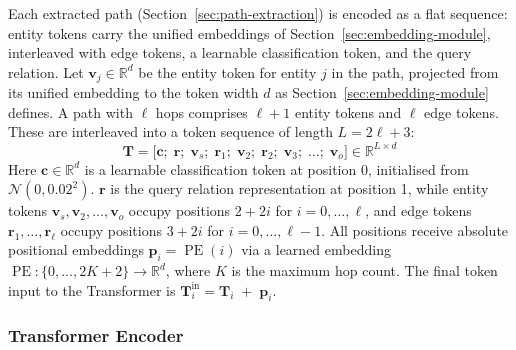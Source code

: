\documentclass[runningheads]{llncs}
\begin{document}
Each extracted path (Section~\ref{sec:path-extraction}) is encoded as a
flat sequence: entity tokens carry the unified embeddings of
Section~\ref{sec:embedding-module}, interleaved with edge tokens, a
learnable classification token, and the query relation.
Let $\mathbf{v}_j \in \mathbb{R}^{d}$ be the entity token for entity $j$
in the path, projected from its unified embedding to the token width $d$
as Section~\ref{sec:embedding-module} defines.
A path with $\ell$ hops comprises $\ell+1$ entity tokens and $\ell$ edge tokens.
These are interleaved into a token sequence of length $L = 2\ell + 3$:
\begin{equation}
  \mathbf{T} = \bigl[\mathbf{c};\; \mathbf{r};\;
    \mathbf{v}_{s};\; \mathbf{r}_{1};\; \mathbf{v}_{2};\; \mathbf{r}_{2};\;
  \mathbf{v}_{3};\; \ldots;\; \mathbf{v}_{o}\bigr]
  \in \mathbb{R}^{L \times d}
  \label{eq:token-seq}
\end{equation}
Here $\mathbf{c} \in \mathbb{R}^{d}$ is a learnable classification token
at position 0, initialised from $\mathcal{N}(0, 0.02^2)$.
$\mathbf{r}$ is the query relation representation at position 1, while entity tokens
$\mathbf{v}_{s}, \mathbf{v}_{2}, \ldots, \mathbf{v}_{o}$ occupy positions $2 + 2i$
for $i = 0, \ldots, \ell$, and edge tokens $\mathbf{r}_{1}, \ldots, \mathbf{r}_{\ell}$
occupy positions $3 + 2i$ for $i = 0, \ldots, \ell - 1$.
All positions receive absolute positional embeddings
$\mathbf{p}_i = \operatorname{PE}(i)$ via a learned embedding
$\operatorname{PE}: \{0, \ldots, 2K+2\} \to \mathbb{R}^{d}$,
where $K$ is the maximum hop count.
The final token input to the Transformer is $\mathbf{T}^{\text{in}}_i = \mathbf{T}_i \;+\; \mathbf{p}_i$.
\subsubsection{Transformer Encoder}

\label{sec:transformer-encoder}
\end{document}
